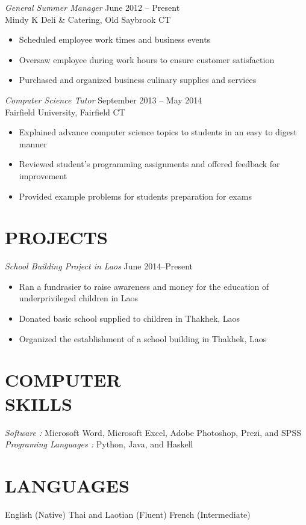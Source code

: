 \documentclass[margin, 10pt]{res}
\begin{document}
\begin{resume}
{\sl General Summer Manager} \hfill June 2012 -- Present\\
{\small{Mindy K Deli \& Catering, Old Saybrook CT}}
\begin{itemize} \itemsep -1.5pt %
  \item Scheduled employee work times and business events
  \item Oversaw employee during work hours to ensure customer satisfaction
  \item Purchased and organized business culinary supplies and services
\end{itemize}
%
{\sl Computer Science Tutor} \hfill September 2013 --  May 2014 \\
{\small{Fairfield University, Fairfield CT}}
\begin{itemize} \itemsep -1.5pt %
  \item Explained advance computer science topics to students in an easy to digest manner
  \item Reviewed student's programming assignments and offered feedback for improvement
  \item Provided example problems for students preparation for exams
\end{itemize}
\section{PROJECTS}
{\sl School Building Project in Laos} \hfill June 2014--Present
\begin{itemize} \itemsep -1.5pt %
  \item Ran a fundrasier to raise awareness and money for the education of underprivileged children in Laos
  \item Donated basic school supplied to children in Thakhek, Laos
  \item Organized the establishment of a school building in Thakhek, Laos
\end{itemize}
\section{COMPUTER \\ SKILLS} 
{\sl Software :} Microsoft Word, Microsoft Excel, Adobe Photoshop, Prezi, and SPSS \\
{\sl Programing Languages :} Python, Java, and Haskell
\section{LANGUAGES}
English (Native) Thai and Laotian (Fluent) French (Intermediate) \\

\end{resume}
\end{document}
